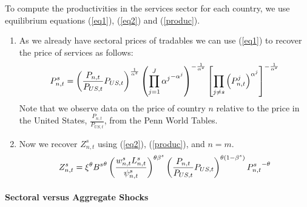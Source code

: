 \documentclass{article}
\begin{document}
To compute the productivities in the services sector for each country, we
use equilibrium equations (\ref{eq1}), (\ref{eq2}) and (\ref{produc}).

\begin{enumerate}
\item As we already have sectoral prices of tradables we can use (\ref{eq1})
to recover the price of services as follows: 
\begin{equation}
P_{n,t}^{s}=\left( \frac{P_{n,t}}{P_{US,t}}P_{US,t}\right) ^{\frac{1}{\alpha
^{s}}}\left( \prod_{j=1}^{J}{\alpha ^{j}}^{-\alpha ^{j}}\right) ^{-\frac{1}{%
\alpha ^{s}}}\left[ \prod_{j\neq s}\left( P_{n,t}^{j}\right) ^{\alpha ^{j}}%
\right] ^{-\frac{1}{\alpha ^{s}}}
\end{equation}%
Note that we observe data on the price of country $n$ relative to the price
in the United States, $\frac{P_{n,t}}{P_{US,t}}$, from the Penn World Tables.

\item Now we recover $Z_{n,t}^{s}$ using (\ref{eq2}), (\ref{produc}), and $%
n=m$. 
\begin{equation}
Z_{n,t}^{s}=\xi ^{\theta }{B^{s}}^{\theta }\left( \frac{%
w_{n,t}^{s}L_{n,t}^{s}}{\psi _{n,t}^{s}}\right) ^{\theta \beta ^{s}}\left( 
\frac{P_{n,t}}{P_{US,t}}P_{US,t}\right) ^{\theta (1-\beta ^{s})}{P_{n,t}^{s}}%
^{-\theta }
\end{equation}
\end{enumerate}

\paragraph{Sectoral versus Aggregate Shocks}
\end{document}

